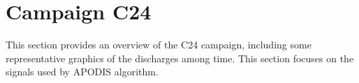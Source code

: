 \chapter{Campaign C24}\label{sec:c24}

This section provides an overview of the C24 campaign, including some representative graphics of the discharges among time. This section focuses on the signals used by \ac{APODIS} algorithm.